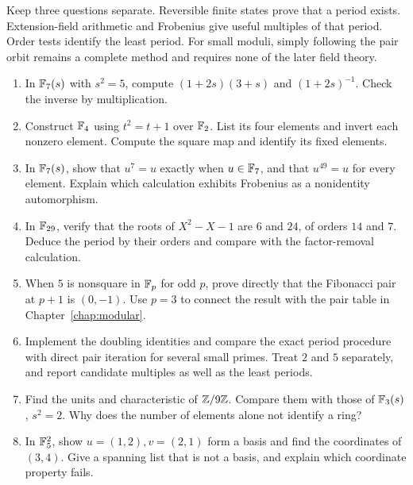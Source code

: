 \begin{checkpoint}
Keep three questions separate. Reversible finite states prove that a
period exists. Extension-field arithmetic and Frobenius give useful
multiples of that period. Order tests identify the least period.
For small moduli, simply following the pair orbit remains a complete
method and requires none of the later field theory.
\end{checkpoint}



\begin{exercisebox}
\begin{enumerate}
  \item In $\mathbb F_7(s)$ with $s^2=5$, compute $(1+2s)(3+s)$ and
  $(1+2s)^{-1}$. Check the inverse by multiplication.
  \item Construct $\mathbb F_4$ using $t^2=t+1$ over $\mathbb F_2$.
  List its four elements and invert each nonzero element.
  Compute the square map and identify its fixed elements.
  \item In $\mathbb F_7(s)$, show that $u^7=u$ exactly when $u\in\mathbb F_7$,
  and that $u^{49}=u$ for every element. Explain which calculation
  exhibits Frobenius as a nonidentity automorphism.
  \item In $\mathbb F_{29}$, verify that the roots of $X^2-X-1$ are $6$ and
  $24$, of orders $14$ and $7$. Deduce the period by their orders
  and compare with the factor-removal calculation.
  \item When $5$ is nonsquare in $\mathbb F_p$ for odd $p$, prove directly
  that the Fibonacci pair at $p+1$ is $(0,-1)$. Use $p=3$ to connect
  the result with the pair table in Chapter~\ref{chap:modular}.
  \item Implement the doubling identities and compare the exact
  period procedure with direct pair iteration for several small
  primes. Treat $2$ and $5$ separately, and report candidate multiples
  as well as the least periods. 
  \item Find the units and characteristic of $\mathbb Z/9\mathbb Z$. Compare them
  with those of $\mathbb F_3(s)$, $s^2=2$. Why does the number of elements
  alone not identify a ring? 
  \item In $\mathbb F_5^2$, show $u=(1,2),v=(2,1)$ form a basis and find
  the coordinates of $(3,4)$. Give a spanning list that is not a basis,
  and explain which coordinate property fails. 

\end{enumerate}
\end{exercisebox}
